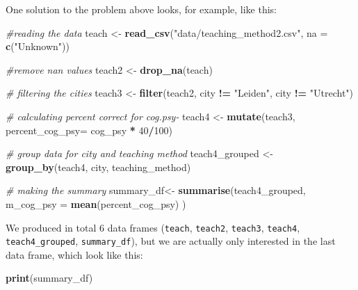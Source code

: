 \documentclass[
]{scrartcl}
\newenvironment{Shaded}{\begin{snugshade}}{\end{snugshade}}
\newcommand{\AttributeTok}[1]{\textcolor[rgb]{0.13,0.29,0.53}{#1}}
\newcommand{\CommentTok}[1]{\textcolor[rgb]{0.56,0.35,0.01}{\textit{#1}}}
\newcommand{\DecValTok}[1]{\textcolor[rgb]{0.00,0.00,0.81}{#1}}
\newcommand{\FunctionTok}[1]{\textcolor[rgb]{0.13,0.29,0.53}{\textbf{#1}}}
\newcommand{\NormalTok}[1]{#1}
\newcommand{\OtherTok}[1]{\textcolor[rgb]{0.56,0.35,0.01}{#1}}
\newcommand{\SpecialCharTok}[1]{\textcolor[rgb]{0.81,0.36,0.00}{\textbf{#1}}}
\newcommand{\StringTok}[1]{\textcolor[rgb]{0.31,0.60,0.02}{#1}}
\begin{document}
One solution to the problem above looks, for example, like this:

\begin{Shaded}
\begin{Highlighting}[]
\CommentTok{\#reading the data}
\NormalTok{teach }\OtherTok{\textless{}{-}} \FunctionTok{read\_csv}\NormalTok{(}\StringTok{"data/teaching\_method2.csv"}\NormalTok{, }\AttributeTok{na =} \FunctionTok{c}\NormalTok{(}\StringTok{"Unknown"}\NormalTok{))}
\end{Highlighting}
\end{Shaded}

\begin{Shaded}
\begin{Highlighting}[]
\CommentTok{\#remove nan values}
\NormalTok{teach2 }\OtherTok{\textless{}{-}} \FunctionTok{drop\_na}\NormalTok{(teach)}

\CommentTok{\# filtering the cities}
\NormalTok{teach3 }\OtherTok{\textless{}{-}} \FunctionTok{filter}\NormalTok{(teach2, city }\SpecialCharTok{!=} \StringTok{"Leiden"}\NormalTok{, city }\SpecialCharTok{!=} \StringTok{"Utrecht"}\NormalTok{)}

\CommentTok{\# calculating percent correct for cog.psy{-}}
\NormalTok{teach4 }\OtherTok{\textless{}{-}} \FunctionTok{mutate}\NormalTok{(teach3, }\AttributeTok{percent\_cog\_psy=}\NormalTok{ cog\_psy }\SpecialCharTok{*} \DecValTok{40}\SpecialCharTok{/}\DecValTok{100}\NormalTok{)}

\CommentTok{\# group data for city and teaching method}
\NormalTok{teach4\_grouped }\OtherTok{\textless{}{-}} \FunctionTok{group\_by}\NormalTok{(teach4, city, teaching\_method)}

\CommentTok{\# making the summary}
\NormalTok{summary\_df}\OtherTok{\textless{}{-}} \FunctionTok{summarise}\NormalTok{(teach4\_grouped,}
                        \AttributeTok{m\_cog\_psy =} \FunctionTok{mean}\NormalTok{(percent\_cog\_psy) )}
\end{Highlighting}
\end{Shaded}

We produced in total 6 data frames (\texttt{teach}, \texttt{teach2}, \texttt{teach3}, \texttt{teach4}, \texttt{teach4\_grouped}, \texttt{summary\_df}), but we are actually only interested in the last data frame, which look like this:

\begin{Shaded}
\begin{Highlighting}[]
\FunctionTok{print}\NormalTok{(summary\_df)}
\end{Highlighting}
\end{Shaded}
\end{document}
